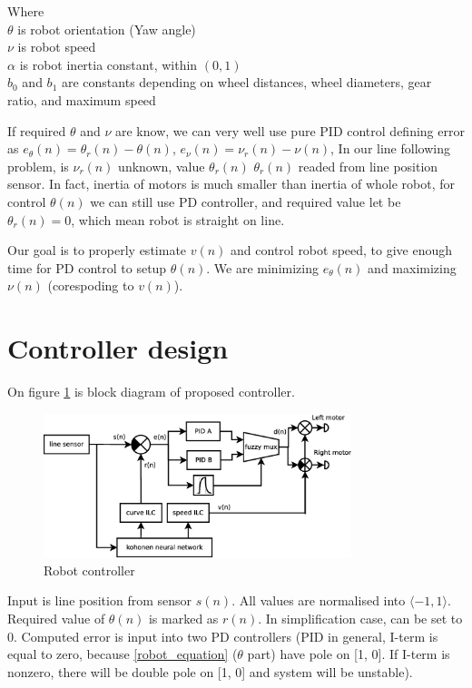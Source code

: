 \documentclass[twoside]{oss-conf-eng}
\begin{document}
Where \\
$\theta$ is robot orientation (Yaw angle) \\
$\nu$ is robot speed \\
$\alpha$ is robot inertia constant, within $(0, 1)$ \\
$b_0$ and $b_1$ are constants depending on wheel distances, wheel diameters, gear ratio, and
maximum speed

If required $\theta$ and $\nu$ are know, we can very well use pure PID control defining error
as $e_{\theta}(n) = \theta_r(n) - \theta(n)$, $e_{\nu}(n) = \nu_r(n) - \nu(n)$,
In our line following problem, is $\nu_r(n)$ unknown, value $\theta_r(n)$ $\theta_r(n)$ readed from
line position sensor. In fact, inertia of motors is much
smaller than inertia of whole robot, for control $\theta(n)$ we can still use PD
controller, and required value let be $\theta_r(n) = 0$, which mean robot is straight on line.

Our goal is to properly estimate $v(n)$ and control robot speed, to give enough time
for PD control to setup $\theta(n)$. We are minimizing $e_{\theta}(n)$ and maximizing $\nu(n)$
(corespoding to $v(n)$).


\section{Controller design}

On figure \ref{fig:robot_controller} is block diagram of proposed controller.

\begin{figure}[]
    \centering
    \includegraphics[width=0.8\textwidth]{block_diagram/robot_block.eps}
    \caption{Robot controller}
    \label{fig:robot_controller}
\end{figure}

Input is line position from sensor $s(n)$. All values are normalised into
$\langle -1, 1 \rangle$.
Required value of $\theta(n)$ is marked as
$r(n)$. In simplification case, can be set to 0. Computed error is input into two
PD controllers (PID in general, I-term is equal to zero, because \ref{robot_equation}
($\theta$ part) have pole on [1, 0]. If I-term is nonzero, there will be double pole on [1, 0] and
system will be unstable).
\end{document}
